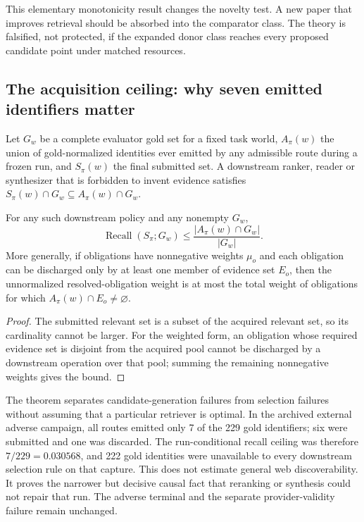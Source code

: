 This elementary monotonicity result changes the novelty test.  A new paper that
improves retrieval should be absorbed into the comparator class.  The theory is
falsified, not protected, if the expanded donor class reaches every proposed
candidate point under matched resources.

\subsection{The acquisition ceiling: why seven emitted identifiers matter}

Let $G_w$ be a complete evaluator gold set for a fixed task world, $A_\pi(w)$
the union of gold-normalized identities ever emitted by any admissible route
during a frozen run, and $S_\pi(w)$ the final submitted set.  A downstream
ranker, reader or synthesizer that is forbidden to invent evidence satisfies
$S_\pi(w)\cap G_w\subseteq A_\pi(w)\cap G_w$.

\begin{theorem}
\label{thm:acquisition-ceiling}
For any such downstream policy and any nonempty $G_w$,
\[
 \operatorname{Recall}(S_\pi;G_w)
 \leq \frac{|A_\pi(w)\cap G_w|}{|G_w|}.
\]
More generally, if obligations have nonnegative weights $\mu_o$ and each
obligation can be discharged only by at least one member of evidence set $E_o$,
then the unnormalized resolved-obligation weight is at most the total weight of
obligations for which $A_\pi(w)\cap E_o\ne\varnothing$.
\end{theorem}

\begin{proof}
The submitted relevant set is a subset of the acquired relevant set, so its
cardinality cannot be larger.  For the weighted form, an obligation whose
required evidence set is disjoint from the acquired pool cannot be discharged
by a downstream operation over that pool; summing the remaining nonnegative
weights gives the bound.
\end{proof}

The theorem separates candidate-generation failures from selection failures
without assuming that a particular retriever is optimal.  In the archived
external adverse campaign, all routes emitted only 7 of the 229 gold
identifiers; six were submitted and one was discarded.  The run-conditional
recall ceiling was therefore $7/229=0.030568$, and 222 gold identities were
unavailable to every downstream selection rule on that capture.  This does not
estimate general web discoverability.  It proves the narrower but decisive
causal fact that reranking or synthesis could not repair that run.  The adverse
terminal and the separate provider-validity failure remain unchanged.

